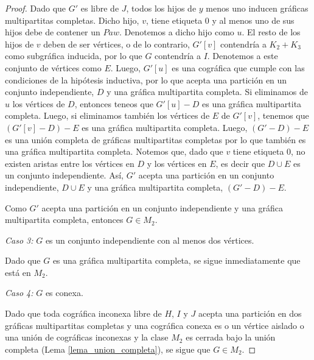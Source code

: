 \begin{proof}
    Dado que $G'$ es libre de $J$, todos los hijos de $y$ menos uno inducen gráficas multipartitas completas. Dicho hijo, $v$, tiene etiqueta 0 y al menos uno de sus hijos debe de contener un $Paw$. Denotemos a dicho hijo como $u$. El resto de los hijos de $v$ deben de ser vértices, o de lo contrario, $G'[v]$ contendría a $K_2 + K_3$ como subgráfica inducida, por lo que $G$ contendría a $I$. Denotemos a este conjunto de vértices como $E$. Luego, $G'[u]$  es una cográfica que cumple con las condiciones de la hipótesis inductiva, por lo que acepta una partición en un conjunto independiente, $D$ y una gráfica multipartita completa. Si eliminamos de $u$ los vértices de $D$, entonces teneos que $G'[u] - D$ es una gráfica multipartita completa. Luego, si eliminamos también los vértices de $E$ de $G'[v]$, tenemos que $(G'[v]-D)-E$ es una gráfica multipartita completa. Luego, $(G'-D)-E$ es una unión completa de gráficas multipartitas completas por lo que también es una gráfica multipartita completa. Notemos que, dado que $v$ tiene etiqueta 0, no existen aristas entre los vértices en $D$ y los vértices en $E$, es decir que $D \cup E$ es un conjunto independiente. Así, $G'$ acepta una partición en un conjunto independiente, $D \cup E$ y una gráfica multipartita completa, $(G' - D) - E$.


    Como $G'$ acepta una partición en un conjunto independiente y una gráfica multipartita completa, entonces $G \in M_2$.


    \emph{Caso 3:} $G$ es un conjunto independiente con al menos dos vértices.

    Dado que $G$ es una gráfica multipartita completa, se sigue inmediatamente que está en $M_2$.

    \emph{Caso 4:} $G$ es conexa.

    Dado que toda cográfica inconexa libre de $H$, $I$ y $J$ acepta una partición en dos gráficas multipartitas completas y una cográfica conexa es o un vértice aislado o una unión de cográficas inconexas y la clase $M_2$ es cerrada bajo la unión completa (Lema \ref{lema_union_completa}), se sigue que $G \in M_2$.

\end{proof}

